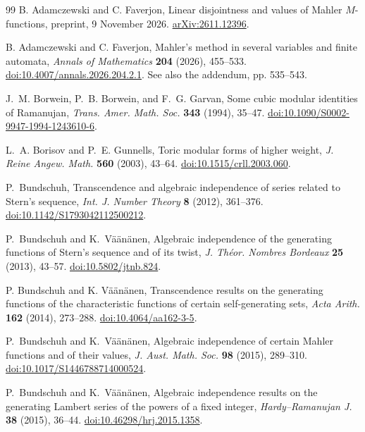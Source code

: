 \documentclass[11pt,a4paper]{article}
\theoremstyle{definition}
\theoremstyle{remark}
\numberwithin{equation}{section}
\begin{document}
\begin{thebibliography}{99}\small
{} B. Adamczewski and C. Faverjon, Linear disjointness and values of Mahler $M$-functions, preprint, 9 November 2026. \href{https://arxiv.org/abs/2611.12396}{arXiv:2611.12396}.

 B. Adamczewski and C. Faverjon, Mahler's method in several variables and finite automata, \textit{Annals of Mathematics} \textbf{204} (2026), 455--533. \href{https://doi.org/10.4007/annals.2026.204.2.1}{doi:10.4007/annals.2026.204.2.1}. See also the addendum, pp. 535--543.

 J.~M. Borwein, P.~B. Borwein, and F.~G. Garvan, Some cubic modular identities of Ramanujan, \emph{Trans. Amer. Math. Soc.} \textbf{343} (1994), 35--47. \href{https://doi.org/10.1090/S0002-9947-1994-1243610-6}{doi:10.1090/S0002-9947-1994-1243610-6}.

 L.~A. Borisov and P.~E. Gunnells, Toric modular forms of higher weight, \emph{J. Reine Angew. Math.} \textbf{560} (2003), 43--64. \href{https://doi.org/10.1515/crll.2003.060}{doi:10.1515/crll.2003.060}.

P.~Bundschuh, Transcendence and algebraic independence of series related
to Stern's sequence, \emph{Int. J. Number Theory} \textbf{8} (2012),
361--376. \href{https://doi.org/10.1142/S1793042112500212}{doi:10.1142/S1793042112500212}.

P.~Bundschuh and K.~V\"a\"an\"anen, Algebraic independence of the generating
functions of Stern's sequence and of its twist, \emph{J. Th\'eor. Nombres
Bordeaux} \textbf{25} (2013), 43--57.
\href{https://doi.org/10.5802/jtnb.824}{doi:10.5802/jtnb.824}.

 P. Bundschuh and K. V\"a\"an\"anen, Transcendence results on the generating functions of the characteristic functions of certain self-generating sets, \emph{Acta Arith.} \textbf{162} (2014), 273--288. \href{https://doi.org/10.4064/aa162-3-5}{doi:10.4064/aa162-3-5}.

P.~Bundschuh and K.~V\"a\"an\"anen, Algebraic independence of certain Mahler
functions and of their values, \emph{J. Aust. Math. Soc.} \textbf{98}
(2015), 289--310.
\href{https://doi.org/10.1017/S1446788714000524}{doi:10.1017/S1446788714000524}.

P.~Bundschuh and K.~V\"a\"an\"anen, Algebraic independence results on the
generating Lambert series of the powers of a fixed integer, \emph{Hardy--Ramanujan J.}
\textbf{38} (2015), 36--44.
\href{https://doi.org/10.46298/hrj.2015.1358}{doi:10.46298/hrj.2015.1358}.


\end{thebibliography}
\end{document}

